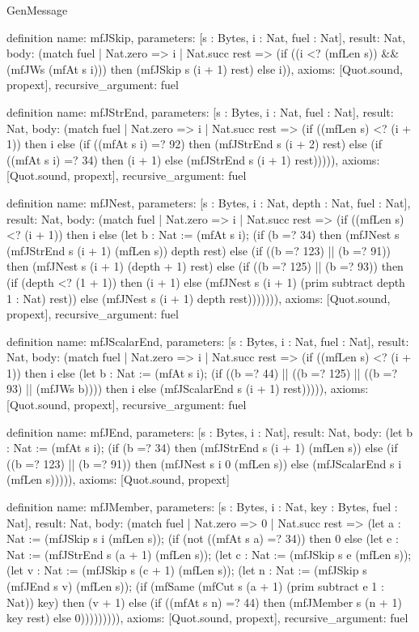 \begin{lexlean}{GenMessage}
\begin{semanticmodule}
definition{
  name: mfJSkip,
  parameters: [s : Bytes, i : Nat, fuel : Nat],
  result: Nat,
  body: (match fuel
    | Nat.zero => i
    | Nat.succ rest => (if ((i <? (mfLen s)) && (mfJWs (mfAt s i))) then (mfJSkip s (i + 1) rest) else i)),
  axioms: [Quot.sound, propext],
  recursive_argument: fuel
}

definition{
  name: mfJStrEnd,
  parameters: [s : Bytes, i : Nat, fuel : Nat],
  result: Nat,
  body: (match fuel
    | Nat.zero => i
    | Nat.succ rest => (if ((mfLen s) <? (i + 1)) then i else (if ((mfAt s i) =? 92) then (mfJStrEnd s (i + 2) rest) else (if ((mfAt s i) =? 34) then (i + 1) else (mfJStrEnd s (i + 1) rest))))),
  axioms: [Quot.sound, propext],
  recursive_argument: fuel
}

definition{
  name: mfJNest,
  parameters: [s : Bytes, i : Nat, depth : Nat, fuel : Nat],
  result: Nat,
  body: (match fuel
    | Nat.zero => i
    | Nat.succ rest => (if ((mfLen s) <? (i + 1)) then i else (let b : Nat := (mfAt s i); (if (b =? 34) then (mfJNest s (mfJStrEnd s (i + 1) (mfLen s)) depth rest) else (if ((b =? 123) || (b =? 91)) then (mfJNest s (i + 1) (depth + 1) rest) else (if ((b =? 125) || (b =? 93)) then (if (depth <? (1 + 1)) then (i + 1) else (mfJNest s (i + 1) (prim subtract depth 1 : Nat) rest)) else (mfJNest s (i + 1) depth rest))))))),
  axioms: [Quot.sound, propext],
  recursive_argument: fuel
}

definition{
  name: mfJScalarEnd,
  parameters: [s : Bytes, i : Nat, fuel : Nat],
  result: Nat,
  body: (match fuel
    | Nat.zero => i
    | Nat.succ rest => (if ((mfLen s) <? (i + 1)) then i else (let b : Nat := (mfAt s i); (if ((b =? 44) || ((b =? 125) || ((b =? 93) || (mfJWs b)))) then i else (mfJScalarEnd s (i + 1) rest))))),
  axioms: [Quot.sound, propext],
  recursive_argument: fuel
}

definition{
  name: mfJEnd,
  parameters: [s : Bytes, i : Nat],
  result: Nat,
  body: (let b : Nat := (mfAt s i); (if (b =? 34) then (mfJStrEnd s (i + 1) (mfLen s)) else (if ((b =? 123) || (b =? 91)) then (mfJNest s i 0 (mfLen s)) else (mfJScalarEnd s i (mfLen s))))),
  axioms: [Quot.sound, propext]
}

definition{
  name: mfJMember,
  parameters: [s : Bytes, i : Nat, key : Bytes, fuel : Nat],
  result: Nat,
  body: (match fuel
    | Nat.zero => 0
    | Nat.succ rest => (let a : Nat := (mfJSkip s i (mfLen s)); (if (not ((mfAt s a) =? 34)) then 0 else (let e : Nat := (mfJStrEnd s (a + 1) (mfLen s)); (let c : Nat := (mfJSkip s e (mfLen s)); (let v : Nat := (mfJSkip s (c + 1) (mfLen s)); (let n : Nat := (mfJSkip s (mfJEnd s v) (mfLen s)); (if (mfSame (mfCut s (a + 1) (prim subtract e 1 : Nat)) key) then (v + 1) else (if ((mfAt s n) =? 44) then (mfJMember s (n + 1) key rest) else 0))))))))),
  axioms: [Quot.sound, propext],
  recursive_argument: fuel
}


\end{semanticmodule}
\end{lexlean}

